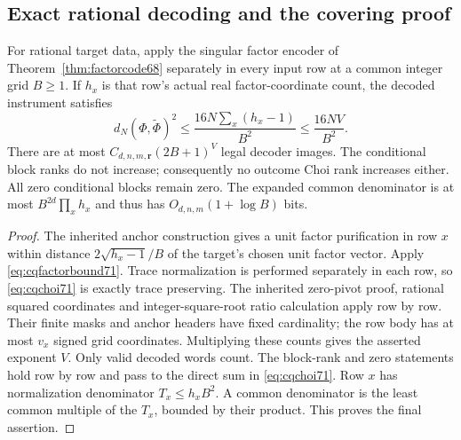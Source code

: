 \subsection{Exact rational decoding and the covering proof}
\begin{lemma}\label{lem:cqcodec71}
For rational target data, apply the singular factor encoder of
Theorem~\ref{thm:factorcode68} separately in every input row at a
common integer grid $B\ge1$. If $h_x$ is that row's actual real
factor-coordinate count, the decoded instrument satisfies
\begin{equation}\label{eq:cqcodeerror71}
 d_N(\Phi,\widetilde\Phi)^2
       \le\frac{16N\sum_x(h_x-1)}{B^2}
       \le\frac{16NV}{B^2}.
\end{equation}
There are at most $C_{d,n,m,\boldsymbol r}(2B+1)^V$ legal decoder
images. The conditional block ranks do not increase; consequently no
outcome Choi rank increases either. All zero conditional blocks remain
zero. The expanded common denominator is at most
$B^{2d}\prod_x h_x$ and thus has $O_{d,n,m}(1+\log B)$ bits.
\end{lemma}
\begin{proof}
The inherited anchor construction gives a unit factor purification in
row $x$ within distance $2\sqrt{h_x-1}/B$ of the target's chosen
unit factor vector. Apply \eqref{eq:cqfactorbound71}. Trace normalization
is performed separately in each row, so \eqref{eq:cqchoi71} is exactly
trace preserving. The inherited zero-pivot proof, rational squared
coordinates and integer-square-root ratio calculation apply row by row.
Their finite masks and anchor headers have fixed cardinality; the row
body has at most $v_x$ signed grid coordinates. Multiplying these
counts gives the asserted exponent $V$. Only valid decoded words count.
The block-rank and zero statements hold row by row and pass to the direct
sum in \eqref{eq:cqchoi71}. Row $x$ has normalization denominator
$T_x\le h_xB^2$. A common denominator is the least common multiple of
the $T_x$, bounded by their product. This proves the final assertion.
\end{proof}

